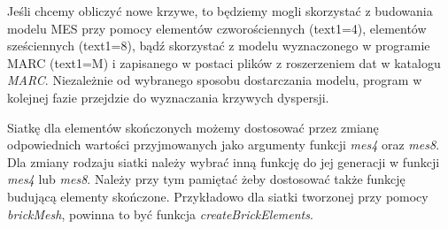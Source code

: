 Jeśli chcemy obliczyć nowe krzywe, to będziemy mogli skorzystać z budowania modelu MES przy pomocy elementów czworościennych (text1=4), elementów sześciennych (text1=8), bądź skorzystać z modelu wyznaczonego w programie MARC (text1=M) i zapisanego w postaci plików z roszerzeniem dat w katalogu \textit{MARC}. Niezależnie od wybranego sposobu dostarczania modelu, program w kolejnej fazie przejdzie do wyznaczania krzywych dyspersji.

Siatkę dla elementów skończonych możemy dostosować przez zmianę odpowiednich wartości przyjmowanych jako argumenty funkcji \textit{mes4} oraz \textit{mes8}. Dla zmiany rodzaju siatki należy wybrać inną funkcję do jej generacji w funkcji \textit{mes4} lub \textit{mes8}. Należy przy tym pamiętać żeby dostosować także funkcję budującą elementy skończone. Przykładowo dla siatki tworzonej przy pomocy \textit{brickMesh}, powinna to być funkcja \textit{createBrickElements}.
